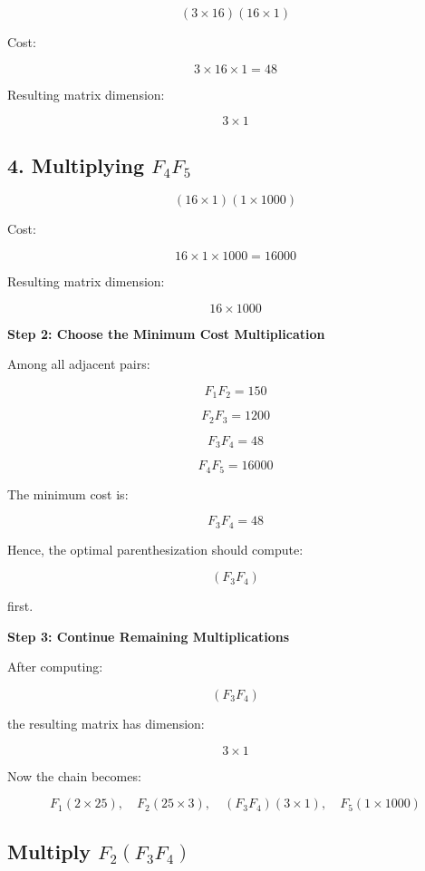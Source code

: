 \documentclass[12pt]{article}
\begin{document}
\[
(3 \times 16)(16 \times 1)
\]

Cost:

\[
3 \times 16 \times 1 = 48
\]

Resulting matrix dimension:

\[
3 \times 1
\]

\vspace{0.3cm}

\subsection*{4. Multiplying $F_4F_5$}

\[
(16 \times 1)(1 \times 1000)
\]

Cost:

\[
16 \times 1 \times 1000 = 16000
\]

Resulting matrix dimension:

\[
16 \times 1000
\]

\vspace{0.5cm}

\textbf{Step 2: Choose the Minimum Cost Multiplication}

Among all adjacent pairs:

\[
F_1F_2 = 150
\]

\[
F_2F_3 = 1200
\]

\[
F_3F_4 = 48
\]

\[
F_4F_5 = 16000
\]

The minimum cost is:

\[
F_3F_4 = 48
\]

Hence, the optimal parenthesization should compute:

\[
(F_3F_4)
\]

first.

\vspace{0.5cm}

\textbf{Step 3: Continue Remaining Multiplications}

After computing:

\[
(F_3F_4)
\]

the resulting matrix has dimension:

\[
3 \times 1
\]

Now the chain becomes:

\[
F_1(2 \times 25), \quad
F_2(25 \times 3), \quad
(F_3F_4)(3 \times 1), \quad
F_5(1 \times 1000)
\]

\vspace{0.3cm}

\subsection*{Multiply $F_2(F_3F_4)$}
\end{document}
